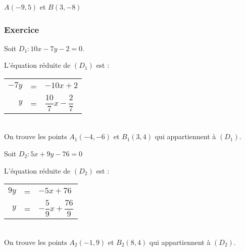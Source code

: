 $A(-9, 5)$ et
$B(3,-8) $

\newpage

\subsubsection{Exercice }

Soit $D_{1} : 10x -7y -2 = 0$.

L'équation réduite de $(D_{1})$ est :

\begin{tabular}{r@{$\;$}c@{$\;$}l}
$-7y$ & = & $ -10x +2 $ \\
$y$ & =& $ \dfrac{10}{7}x-\dfrac{2}{7} $ \\
\end{tabular} \\

On trouve les points $A_{1}(-4, -6) $ et $  B_{1}(3,4) $ qui appartiennent à $(D_{1})$.

\vspace{.5cm}

Soit $D_{2} : 5x +9y -76 = 0$ 

L'équation réduite de $(D_{2})$ est :

\begin{tabular}{r@{$\;$}c@{$\;$}l}
$9y$ & =& $ -5x +76 $ \\
$y$ & =& $ -\dfrac{5}{9}x+\dfrac{76}{9}$\\
\end{tabular} \\

On trouve les points  $A_{2}(-1, 9) $ et $ B_{2}(8,4) $ qui appartiennent à $(D_{2})$.


\vspace{.5cm}

